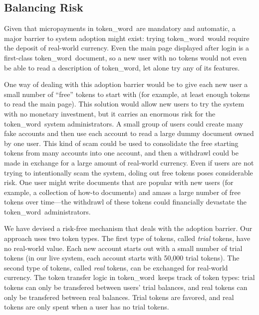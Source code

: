 \documentclass{acm_proc_article-sp}
\newcommand{\tokenWord}{token\_word}
\begin{document}
\subsection{Balancing Risk}
Given that micropayments in \tokenWord \  are mandatory and automatic, a major barrier to system adoption might exist:  trying \tokenWord \  would require the deposit of real-world currency.
Even the main page displayed after login is a first-class \tokenWord \  document, so a new user with no tokens would not even be able to read a description of \tokenWord, let alone try any of its features.

One way of dealing with this adoption barrier would be to give each new user a small number of ``free'' tokens to start with (for example, at least enough tokens to read the main page).
This solution would allow new users to try the system with no monetary investment, but it carries an enormous risk for the \tokenWord \  system administrators.
A small group of users could create many fake accounts and then use each account to read a large dummy document owned by one user.
This kind of scam could be used to consolidate the free starting tokens from many accounts into one account, and then a withdrawl could be made in exchange for a large amount of real-world currency.
Even if users are not trying to intentionally scam the system, doling out free tokens poses considerable risk.
One user might write documents that are popular with new users (for example, a collection of how-to documents) and amass a large number of free tokens over time---the withdrawl of these tokens could financially devastate the \tokenWord \  administrators.

We have devised a risk-free mechanism that deals with the adoption barrier.  
Our approach uses two token types.
The first type of tokens, called \textit{trial} tokens, have no real-world value.
Each new account starts out with a small number of trial tokens (in our live system, each account starts with 50,000 trial tokens).
The second type of tokens, called \textit{real} tokens, can be exchanged for real-world currency.
The token transfer logic in \tokenWord \  keeps track of token types:  trial tokens can only be transfered between users' trial balances, and real tokens can only be transfered between real balances.
Trial tokens are favored, and real tokens are only spent when a user has no trial tokens.
\end{document}
